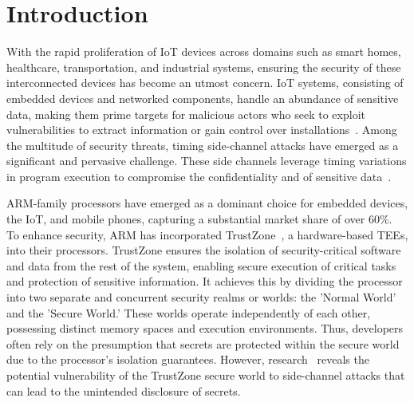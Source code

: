 \section{Introduction} \label{sect:intro3}

With the rapid proliferation of \ac{IoT} devices across domains such as
smart homes, healthcare, transportation, and industrial systems, ensuring
the security of these interconnected devices has become an utmost concern.
\ac{IoT} systems, consisting of embedded devices and networked components,
handle an abundance of sensitive data, making them prime targets for
malicious actors who seek to exploit vulnerabilities to extract information
or gain control over installations~\cite{IOTSecurity1, IOTSecurity2}. Among
the multitude of security threats, timing side-channel attacks have emerged
as a significant and pervasive challenge. These side channels leverage
timing variations in program execution to compromise the confidentiality
and of sensitive data~\cite{timingattack, Nemesis, Cache1,
brumley2011remote, Travis, busted}.  

ARM-family processors have emerged as a dominant choice for embedded
devices, the \ac{IoT}, and mobile phones, capturing a substantial market
share of over 60\%\cite{arm_qualcomm}. To enhance security, ARM has
incorporated TrustZone~\cite{TZM, DemystifyingAT}, a hardware-based
\acp{TEE}, into their processors. TrustZone ensures the isolation of
security-critical software and data from the rest of the system, enabling
secure execution of critical tasks and protection of sensitive information.
It achieves this by dividing the processor into two separate and concurrent
security realms or worlds: the 'Normal World' and the 'Secure World.' These
worlds operate independently of each other, possessing distinct memory
spaces and execution environments. Thus, developers often rely on the
presumption that secrets are protected within the secure world due to the
processor's isolation guarantees.  However, research~\cite{surveyonTEE,
DemystifyingAT, loadstep, truspy, Bypassed, Qualcomm, busted} reveals the
potential vulnerability of the TrustZone secure world to side-channel
attacks that can lead to the unintended disclosure of secrets. 


